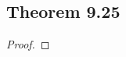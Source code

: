 \documentclass[../../main.tex]{subfiles}
\begin{document}
\subsection{Theorem 9.25}
\begin{wts}

\end{wts}
\begin{proof}

\end{proof}
\end{document}
